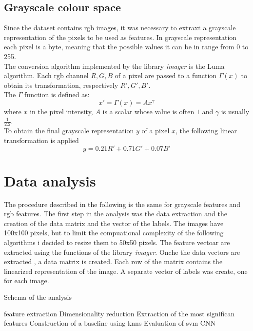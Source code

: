 \documentclass{article}
\begin{document}
\subsection{Grayscale colour space}
Since the dataset contains rgb images, it was necessary to extraxt a grayscale representation of the pixels to be used as features.
In grayscale representation each pixel is a byte, meaning that the possible values it can be in range from 0 to 255. \\
The conversion algorithm implemented by the library \textit{imager} is the Luma algorithm. Each rgb channel $R, G, B$ of a pixel are passed to a function $\Gamma(x)$ to obtain its transformation, respectively $R', G', B'$. \\
The $\Gamma$ function is defined as: 
\begin{equation}
 x' = \Gamma(x) = Ax^{\gamma}
\end{equation}
where $x$ in the pixel intensity, $A$ is a scalar whose value is often $1$ and $\gamma$ is usually $\frac{1}{2.2}$.\\
To obtain the final grayscale representation  $y$ of a pixel $x$, the following linear transformation is applied  \cite{grayscaleconversion}
\begin{equation}
 y = 0.21 R' + 0.71 G' + 0.07  B'
\end{equation}


\section{Data analysis}
The procedure described in the following is the same for grayscale features and rgb features.
The first step in the analysis was the data extraction and the creation of the data matrix and the vector of the labels. 
The images have 100x100 pixels, but to limit the compuational complexity of the following algorithms i decided to resize them to 50x50 pixels.
The feature vectoar are extracted using the functions of the library \textit{imager}. Onche the data vectors are extracted , a data matrix is created. Each row of the matrix contains the linearized representation of the image. A separate vector of labels was create, one for each image. 

\begin{algorithm}[H] 
   \caption{Schema of the analysis}
    \begin{algorithmic}[1]
    \State feature extraction
    \State Dimensionality reduction
    \State Extraction of the most significan features
    \State Construction of a baseline using knns
    \State Evaluation of svm
    \State CNN
\end{algorithmic}
\end{algorithm}
\end{document}
